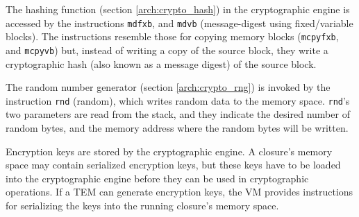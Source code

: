 The hashing function (section \ref{arch:crypto_hash}) in the cryptographic
engine is accessed by the instructions \texttt{mdfxb}, and \texttt{mdvb}
(message-digest using fixed/variable blocks). The instructions resemble those
for copying memory blocks (\texttt{mcpyfxb}, and \texttt{mcpyvb}) but, instead
of writing a copy of the source block, they write a cryptographic hash (also
known as a message digest) of the source block.

The random number generator (section \ref{arch:crypto_rng}) is invoked by the
instruction \texttt{rnd} (random), which writes random data to the memory
space. \texttt{rnd}'s two parameters are read from the stack, and they indicate
the desired number of random bytes, and the memory address where the random
bytes will be written.

Encryption keys are stored by the cryptographic engine. A closure's memory
space may contain serialized encryption keys, but these keys have to be loaded
into the cryptographic engine before they can be used in cryptographic
operations. If a TEM can generate encryption keys, the VM provides instructions
for serializing the keys into the running closure's memory space. 
